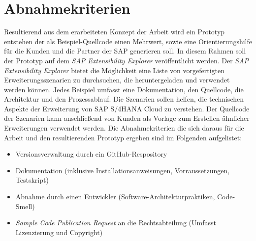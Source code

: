 \section{Abnahmekriterien}
Resultierend aus dem erarbeiteten Konzept der Arbeit wird ein Prototyp entstehen der als Beispiel-Quellcode einen Mehrwert, sowie eine Orientierungshilfe für die Kunden und die Partner der SAP generieren soll. In diesem Rahmen soll der Prototyp auf dem \textit{SAP Extensibility Explorer} veröffentlicht werden. Der \textit{SAP Extensibility Explorer} bietet die Möglichkeit eine Liste von vorgefertigten Erweiterungsszenarien zu durchsuchen, die heruntergeladen und verwendet werden können. Jedes Beispiel umfasst eine Dokumentation, den Quellcode, die Architektur und den Prozessablauf. Die Szenarien sollen helfen, die technischen Aspekte der Erweiterung von SAP S/4HANA Cloud zu verstehen. Der Quellcode der Szenarien kann anschließend von Kunden als Vorlage zum Erstellen ähnlicher Erweiterungen verwendet werden. Die Abnahmekriterien die sich daraus für die Arbeit und den resultierenden Prototyp ergeben sind im Folgenden aufgelistet:
\begin{itemize}
    \item Versionsverwaltung durch ein GitHub-Respository
    \item Dokumentation (inklusive Installationsanweisungen, Vorraussetzungen, Testskript)
    \item Abnahme durch einen Entwickler (Software-Architekturpraktiken, Code-Smell)
    \item \textit{Sample Code Publication Request} an die Rechtsabteilung (Umfasst Lizenzierung und Copyright)
\end{itemize}
